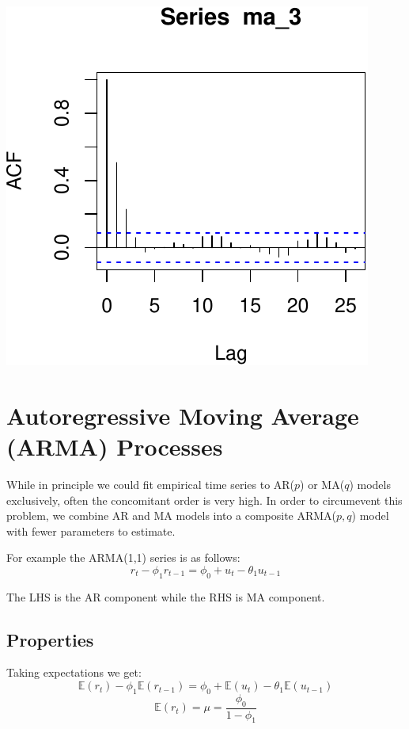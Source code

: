 \documentclass[11pt,]{article}
\begin{document}
\begin{center}\includegraphics{FMC_T4_PhD_ARMA_GARCH_files/figure-latex/MA-7} \end{center}

\section{Autoregressive Moving Average (ARMA)
Processes}\label{autoregressive-moving-average-arma-processes}

While in principle we could fit empirical time series to AR(\(p\)) or
MA(\(q\)) models exclusively, often the concomitant order is very high.
In order to circumevent this problem, we combine AR and MA models into a
composite ARMA(\(p,q\)) model with fewer parameters to estimate.

For example the ARMA(1,1) series is as follows:
\[r_t-\phi_1r_{t-1} = \phi_0 + u_t -\theta_1u_{t-1}\]

The LHS is the AR component while the RHS is MA component.

\subsection{Properties}\label{properties}

Taking expectations we get:
\[\mathbb{E}(r_t)-\phi_1\mathbb{E}(r_{t-1}) = \phi_0 + \mathbb{E}(u_t) - \theta_1\mathbb{E}(u_{t-1})\]
\[\mathbb{E}(r_t) = \mu = \frac{\phi_0}{1-\phi_1}\]
\end{document}
